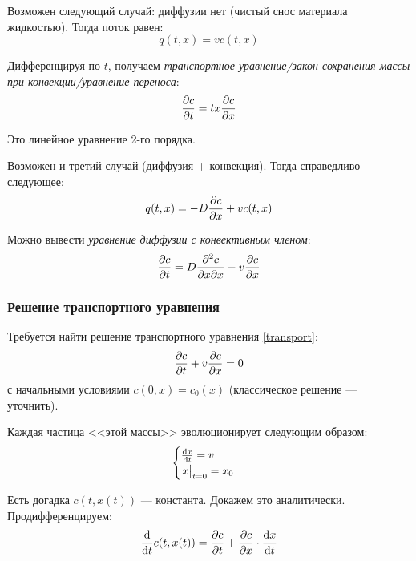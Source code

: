 Возможен следующий случай: диффузии нет (чистый снос материала жидкостью). Тогда поток равен:
%
\begin{equation}
  q(t, x) = vc(t, x)
\end{equation}

Дифференцируя по $t$, получаем \emph{транспортное уравнение/закон сохранения массы при конвекции/уравнение переноса}:
%
\begin{equation}
  \pdv{c}{t} (t, x) = tx \pdv{c}{x} (t, x) \label{transport}
\end{equation}

Это линейное уравнение 2-го порядка.

Возможен и третий случай (диффузия + конвекция). Тогда справедливо следующее:
%
\begin{equation}
  q(t, x) = -D \pdv{c}{x} (t, x) + v c(t, x)
\end{equation}

Можно вывести \emph{уравнение диффузии с конвективным членом}:
%
\begin{equation}
  \pdv{c}{t}(t, x) = D \pdv{c}{x}{x} (t, x) - v \pdv{c}{x} (t, x)
\end{equation}

\subsubsection{Решение транспортного уравнения}

Требуется найти решение транспортного уравнения \eqref{transport}:
%
\begin{equation}
  \pdv{c}{t} + v \pdv{c}{x} = 0 \label{transport2}
\end{equation}
%
с начальными условиями $c(0, x) = c_0(x)$ (классическое решение --- {\color{gray} уточнить}).

Каждая частица <<этой массы>> эволюционирует следующим образом:
%
\begin{equation}
  \begin{cases}
    \dv{x}{t} = v \\
    \eval{x}_{t=0} = x_0
  \end{cases}
\end{equation}

Есть догадка $c(t, x(t))$ --- константа. Докажем это аналитически. Продифференцируем:
%
\begin{equation}
  \dv{t} c(t, x(t)) = \pdv{c}{t} (t, x(t)) + \pdv{c}{x} (t, x(t)) \cdot \dv{x}{t}
\end{equation}

